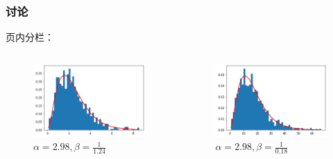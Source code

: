 \documentclass[AutoFakeBold,AutoFakeSlant]{beamer}
\begin{document}
\begin{frame}
  \frametitle{讨论}
  页内分栏：
  \begin{columns}

  \begin{figure}
    \includegraphics[width=\textwidth]{image/result1.png}
    \caption{$\alpha=2.98, \beta=\frac{1}{1.24}$}
    \label{fig1}
  \end{figure}
  
  
  \begin{figure}
    \includegraphics[width=\textwidth]{image/result2.png}
    \caption{$\alpha=2.98, \beta=\frac{1}{0.18}$}
    \label{fig2}
  \end{figure}
  
  \end{columns}

\end{frame}
\end{document}
